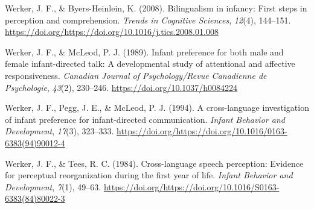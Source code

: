 \documentclass[english,,man,floatsintext]{apa6}
\begin{document}
\leavevmode\hypertarget{ref-werker_2008}{}%
Werker, J. F., \& Byers-Heinlein, K. (2008). Bilingualism in infancy: First steps in perception and comprehension. \emph{Trends in Cognitive Sciences}, \emph{12}(4), 144--151. \url{https://doi.org/https://doi.org/10.1016/j.tics.2008.01.008}

\leavevmode\hypertarget{ref-werker_1989}{}%
Werker, J. F., \& McLeod, P. J. (1989). Infant preference for both male and female infant-directed talk: A developmental study of attentional and affective responsiveness. \emph{Canadian Journal of Psychology/Revue Canadienne de Psychologie}, \emph{43}(2), 230--246. \url{https://doi.org/10.1037/h0084224}

\leavevmode\hypertarget{ref-werker_1994}{}%
Werker, J. F., Pegg, J. E., \& McLeod, P. J. (1994). A cross-language investigation of infant preference for infant-directed communication. \emph{Infant Behavior and Development}, \emph{17}(3), 323--333. \url{https://doi.org/https://doi.org/10.1016/0163-6383(94)90012-4}

\leavevmode\hypertarget{ref-werker_1984}{}%
Werker, J. F., \& Tees, R. C. (1984). Cross-language speech perception: Evidence for perceptual reorganization during the first year of life. \emph{Infant Behavior and Development}, \emph{7}(1), 49--63. \url{https://doi.org/https://doi.org/10.1016/S0163-6383(84)80022-3}

\endgroup

\clearpage
\makeatletter
\efloat@restorefloats
\makeatother
\end{document}
